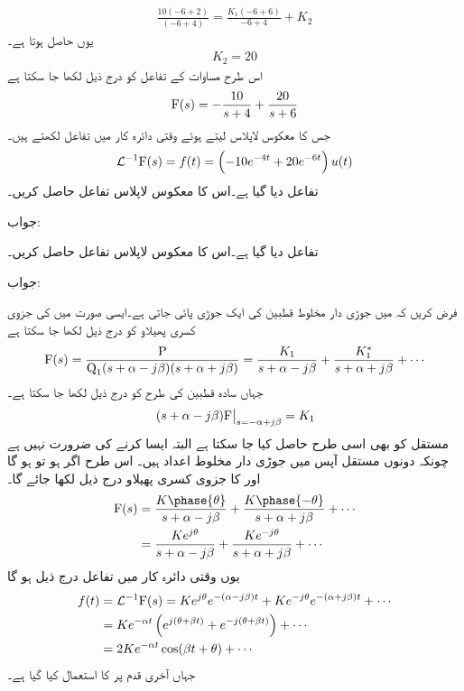 \begin{align*}
\frac{10(-6+2)}{(-6+4)}=\frac{K_1(-6+6)}{-6+4}+K_2
\end{align*}
یوں  حاصل ہوتا ہے۔
\begin{align*}
K_2=20
\end{align*}
اس طرح مساوات  کے تفاعل کو درج ذیل لکھا جا سکتا ہے
\begin{align*}
{\ensuremath{{\textup{F}}}}(s)=-\frac{10}{s+4}+\frac{20}{s+6}
\end{align*}
جس کا معکوس لاپلاس لیتے ہوئے وقتی دائرہ کار میں تفاعل لکھتے ہیں۔
\begin{align*}
\mathcal{L}^{-1} {{\textup{F}}}(s)=f(t)=\left(-10e^{-4t}+20e^{-6t}\right)u(t)
\end{align*}
تفاعل  دیا گیا ہے۔اس کا معکوس لاپلاس تفاعل حاصل کریں۔

جواب:

تفاعل  دیا گیا ہے۔اس کا معکوس لاپلاس تفاعل حاصل کریں۔

جواب:

فرض کریں کہ  میں جوڑی دار مخلوط قطبین کی ایک جوڑی پائی جاتی ہے۔ایسی صورت میں  کی جزوی کسری پھیلاو کو درج ذیل لکھا جا سکتا ہے
\begin{align*}
{\ensuremath{{\textup{F}}}}(s)=\frac{{{\textup{P}}}}{{{\textup{Q}}}_1 (s+\alpha-j\beta)(s+\alpha+j\beta)}=\frac{K_1}{s+\alpha-j\beta}+\frac{K^*_1}{s+\alpha+j\beta}+\cdots
\end{align*}
جہاں سادہ قطبین کی طرح  کو درج ذیل لکھا جا سکتا ہے۔
\begin{align}
\left. (s+\alpha-j\beta){{\textup{F}}}\right|_{s=-\alpha+j\beta}=K_1
\end{align}
مستقل  کو بھی اسی طرح حاصل کیا جا سکتا ہے البتہ ایسا کرنے کی ضرورت نہیں ہے چونکہ دونوں مستقل آپس میں جوڑی دار مخلوط اعداد ہیں۔ اس طرح اگر  ہو تو  ہو گا اور  کا جزوی کسری پھیلاو درج ذیل لکھا جائے گا۔
\begin{align*}
\bF(s)&=\frac{K\phase{\theta}}{s+\alpha-j\beta}+\frac{K\phase{-\theta}}{s+\alpha+j\beta}+\cdots\\
&=\frac{Ke^{j\theta}}{s+\alpha-j\beta}+\frac{Ke^{-j\theta}}{s+\alpha+j\beta}+\cdots
\end{align*}
یوں وقتی دائرہ کار میں تفاعل درج ذیل ہو گا
\begin{align*}
f(t)&=\mathcal{L}^{-1}{{\textup{F}}}(s)=Ke^{j\theta}e^{-(\alpha-j\beta)t}+Ke^{-j\theta}e^{-(\alpha+j\beta)t}+\cdots\\
&=Ke^{-\alpha t}\left(e^{j(\theta+\beta t)}+e^{-j(\theta+\beta t)}\right)+\cdots\\
&=2Ke^{-\alpha t}\cos(\beta t+\theta)+\cdots
\end{align*}
جہاں آخری قدم پر  کا استعمال کیا گیا ہے۔

